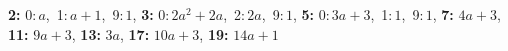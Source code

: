 \textsf{\bfseries 2:} 0:\,$a$,\ 1:\,$a + 1$,\ 9:\,$1$, \textsf{\bfseries 3:} 0:\,$2a^2 + 2a$,\ 2:\,$2a$,\ 9:\,$1$, \textsf{\bfseries 5:} 0:\,$3a + 3$,\ 1:\,$1$,\ 9:\,$1$, \textsf{\bfseries 7:} $4a + 3$, \textsf{\bfseries 11:} $9a + 3$, \textsf{\bfseries 13:} $3a$, \textsf{\bfseries 17:} $10a + 3$, \textsf{\bfseries 19:} $14a + 1$
